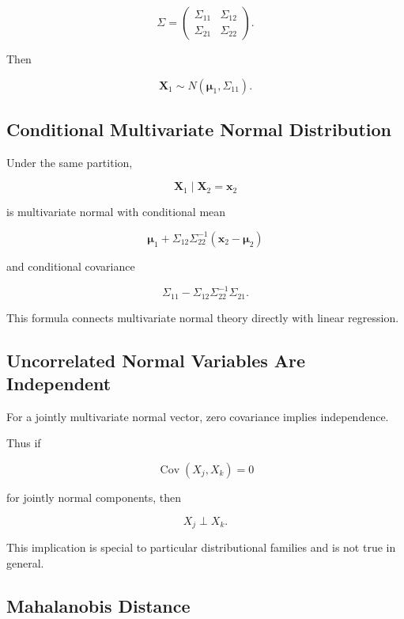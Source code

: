 \[
\Sigma
=
\begin{pmatrix}
\Sigma_{11}
&
\Sigma_{12}
\\
\Sigma_{21}
&
\Sigma_{22}
\end{pmatrix}.
\]

Then

\[
\boxed{
\mathbf{X}_1
\sim
N
(
\boldsymbol{\mu}_1,
\Sigma_{11}
).
}
\]

\subsection{Conditional Multivariate Normal Distribution}
\label{subsec:conditional-multivariate-normal}

Under the same partition,

\[
\boxed{
\mathbf{X}_1
\mid
\mathbf{X}_2=\mathbf{x}_2
}
\]

is multivariate normal with conditional mean

\[
\boxed{
\boldsymbol{\mu}_1
+
\Sigma_{12}
\Sigma_{22}^{-1}
(
\mathbf{x}_2-\boldsymbol{\mu}_2
)
}
\]

and conditional covariance

\[
\boxed{
\Sigma_{11}
-
\Sigma_{12}
\Sigma_{22}^{-1}
\Sigma_{21}.
}
\]

This formula connects multivariate normal theory directly with linear
regression.

\subsection{Uncorrelated Normal Variables Are Independent}
\label{subsec:uncorrelated-normal-independent}

For a jointly multivariate normal vector, zero covariance implies
independence.

Thus if

\[
\boxed{
\operatorname{Cov}(X_j,X_k)=0
}
\]

for jointly normal components, then

\[
\boxed{
X_j
\perp X_k.
}
\]

This implication is special to particular distributional families and is
not true in general.

\subsection{Mahalanobis Distance}
\label{subsec:mahalanobis-distance}

